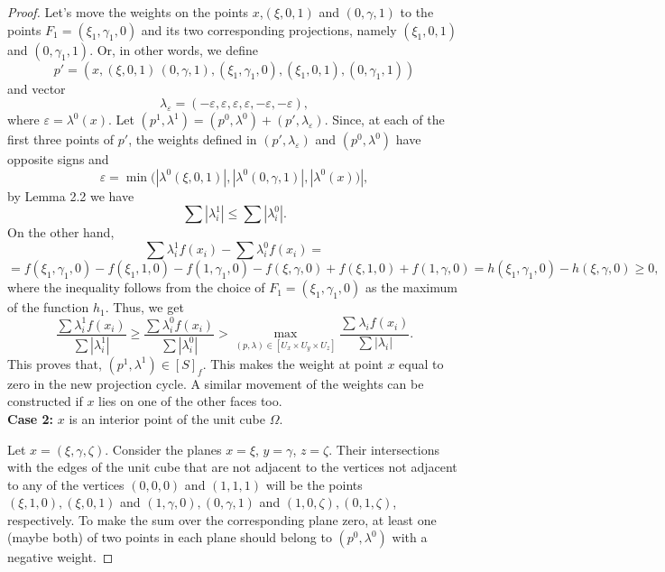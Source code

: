 \documentclass[12p]{article}
\numberwithin{equation}{section}
\begin{document}
\begin{proof}
Let's move the weights on the points \(x\),\((\xi,0,1)\) and \((0,\gamma,1)\) to the points \(F_1=(\xi_1,\gamma_1,0)\) and its two corresponding projections, namely \((\xi_1,0,1)\) and \((0,\gamma_1,1)\). Or, in other words, we define \[p'=(x,(\xi,0,1)\,(0,\gamma,1),(\xi_1,\gamma_1,0),(\xi_1,0,1),(0,\gamma_1,1))\]
and vector 
    \[ \lambda_{\varepsilon}=(-\varepsilon,\varepsilon,\varepsilon,\varepsilon,-\varepsilon,-\varepsilon), \]
    where \(\varepsilon=\lambda^0(x)\).
    Let \((p^1,\lambda^1)=(p^0,\lambda^0)+(p',\lambda_{\varepsilon})\). Since, at each of the first three points of \(p'\), the weights defined in \((p',\lambda_{\varepsilon})\) and \((p^0,\lambda^0)\) have opposite signs and
    \[ \varepsilon=\min(|\lambda^0(\xi,0,1)|,|\lambda^0(0,\gamma,1)|,|\lambda^0(x))|, \]
    by Lemma 2.2 we have
    \[
    \sum|\lambda^1_i| \le \sum|\lambda^0_i|.
    \]
On the other hand, 
\[
    \sum\lambda^1_if(x_i)-\sum\lambda^0_if(x_i)=
\]
\[
    =f(\xi_1,\gamma_1,0)-f(\xi_1,1,0)-f(1,\gamma_1,0)-f(\xi,\gamma,0)+f(\xi,1,0)+f(1,\gamma,0)=h(\xi_1,\gamma_1,0)-h(\xi,\gamma,0) \ge 0,
\]
where the inequality follows from the choice of \(F_1=(\xi_1,\gamma_1,0)\) as the maximum of the function \(h_1\).
Thus, we get
\[
    \frac{\sum\lambda^1_if(x_i)}{\sum|\lambda^1_i|} \ge \frac{\sum\lambda^0_if(x_i)}{\sum|\lambda^0_i|} >\max_{(p,\lambda) \in [U_x\times U_y \times U_z]}\frac{\sum_{} \lambda_if(x_i)}{\sum|\lambda_i|}.
\]
This proves that, \((p^1,\lambda^1) \in [S]_{f}\).
This makes the weight at point \(x\) equal to zero in the new projection cycle. A similar movement of the weights can be constructed if \(x\) lies on one of the other faces too.\\
\textbf{Case 2:} \(x\) is an interior point of the unit cube \(\Omega\).
    
Let \(x=(\xi, \gamma, \zeta)\). Consider the planes \(x=\xi\), \(y=\gamma\), \(z=\zeta\). Their intersections with the edges of the unit cube that are not adjacent to the vertices not adjacent to any of the vertices \((0,0,0)\) and \((1,1,1)\) will be the points \((\xi,1,0),(\xi,0,1)\) and \((1, \gamma, 0),(0, \gamma, 1)\) and \((1, 0, \zeta),(0, 1, \zeta)\), respectively. To make the sum over the corresponding plane zero, at least one (maybe both) of two points in each plane should belong to \((p^0,\lambda^0)\) with a negative weight.
    

\end{proof}
\end{document}
